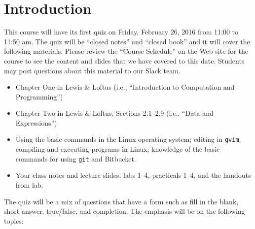 


\section*{Introduction}

This course will have its first quiz on Friday, February 26, 2016 from 11:00 to 11:50 am. The quiz will be ``closed
notes'' and ``closed book'' and it will cover the following materials. Please review the ``Course Schedule'' on the Web
site for the course to see the content and slides that we have covered to this date. Students may post questions about
this material to our Slack team.

\begin{itemize}

  \itemsep 0in

  \item Chapter One in Lewis \& Loftus (i.e., ``Introduction to Computation and Programming'')

  \item Chapter Two in Lewis \& Loftus, Sections 2.1--2.9 (i.e., ``Data and Expressions'')

  \item Using the basic commands in the Linux operating system; editing in {\tt gvim}, compiling and executing
    programs in Linux; knowledge of the basic commands for using {\tt git} and Bitbucket.

  \item Your class notes and lecture slides, labs 1--4, practicals 1--4, and the handouts from lab.

\end{itemize}

\noindent The quiz will be a mix of questions that have a form such as fill in the blank, short answer, true/false, and
completion.  The emphasis will be on the following topics:

